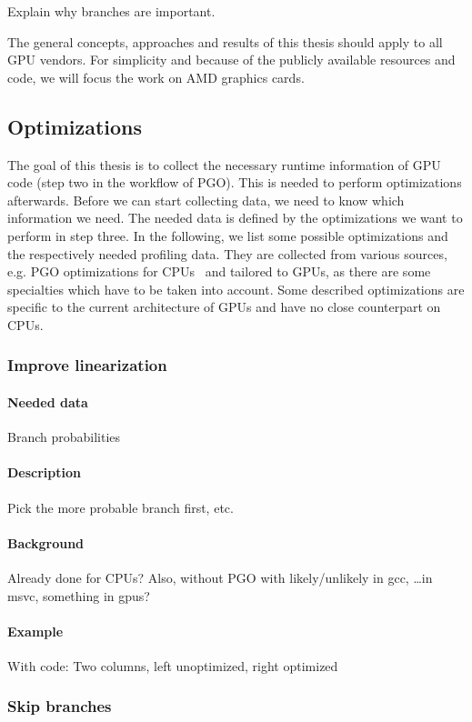Explain why branches are important.

The general concepts, approaches and results of this thesis should apply to all GPU vendors. For simplicity and because of the publicly available resources and code, we will focus the work on AMD graphics cards.

\subsection{Optimizations}
The goal of this thesis is to collect the necessary runtime information of GPU code (step two in the workflow of PGO). This is needed to perform optimizations afterwards. Before we can start collecting data, we need to know which information we need. The needed data is defined by the optimizations we want to perform in step three.
In the following, we list some possible optimizations and the respectively needed profiling data. They are collected from various sources, e.g. PGO optimizations for CPUs~\cite{MicrosoftPgo} and tailored to GPUs, as there are some specialties which have to be taken into account. Some described optimizations are specific to the current architecture of GPUs and have no close counterpart on CPUs.

\subsubsection{Improve linearization}
\paragraph{Needed data} Branch probabilities
\paragraph{Description} Pick the more probable branch first, etc.
\paragraph{Background} Already done for CPUs? Also, without PGO with likely/unlikely in gcc, \dots in msvc, something in gpus?
\paragraph{Example} With code: Two columns, left unoptimized, right optimized

\subsubsection{Skip branches}

